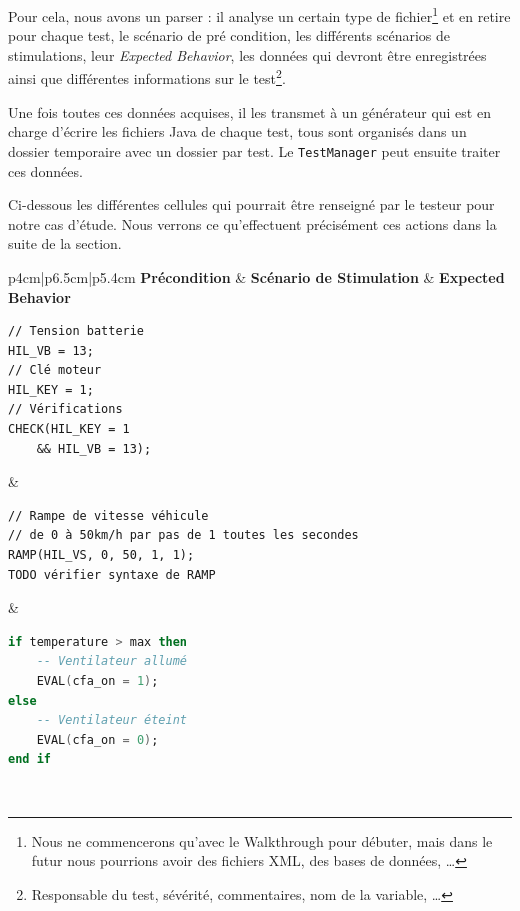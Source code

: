 Pour cela, nous avons un parser : il analyse un certain type de fichier\footnote{Nous ne commencerons qu'avec le Walkthrough pour débuter, mais dans le futur nous pourrions avoir des fichiers XML, des bases de données, \ldots} et en retire pour chaque test, le scénario de pré condition, les différents scénarios de stimulations, leur \textit{Expected Behavior}, les données qui devront être enregistrées ainsi que différentes informations sur le test\footnote{Responsable du test, sévérité, commentaires, nom de la variable, \ldots}.

Une fois toutes ces données acquises, il les transmet à un générateur qui est en charge d'écrire les fichiers Java de chaque test, tous sont organisés dans un dossier temporaire avec un dossier par test. Le \texttt{TestManager} peut ensuite traiter ces données.

\begin{exemple}
Ci-dessous les différentes cellules qui pourrait être renseigné par le testeur pour notre cas d'étude. Nous verrons ce qu'effectuent précisément ces actions dans la suite de la section.	

\begin{tabular}{p{4cm}|p{6.5cm}|p{5.4cm}}
	\textbf{Précondition} & \textbf{Scénario de Stimulation} & \textbf{Expected Behavior}\\
	\hline
	\begin{minipage}{0.1\linewidth}
		\begin{lstlisting}[framerule=0pt]
// Tension batterie
HIL_VB = 13;
// Clé moteur
HIL_KEY = 1;
// Vérifications
CHECK(HIL_KEY = 1 
	&& HIL_VB = 13);
	\end{lstlisting}
	\end{minipage} & 
	\begin{minipage}{0.1\linewidth}
		\begin{lstlisting}[framerule=0pt]
// Rampe de vitesse véhicule
// de 0 à 50km/h par pas de 1 toutes les secondes	
RAMP(HIL_VS, 0, 50, 1, 1);
TODO vérifier syntaxe de RAMP		
		\end{lstlisting}
	\end{minipage} 
	&
		\begin{minipage}{0.1\linewidth}
			\begin{lstlisting}[language=ada,framerule=0pt]	
if temperature > max then
	-- Ventilateur allumé
	EVAL(cfa_on = 1); 
else
	-- Ventilateur éteint
	EVAL(cfa_on = 0); 
end if
			\end{lstlisting}
		\end{minipage} 
	\\
\end{tabular}
\end{exemple}

